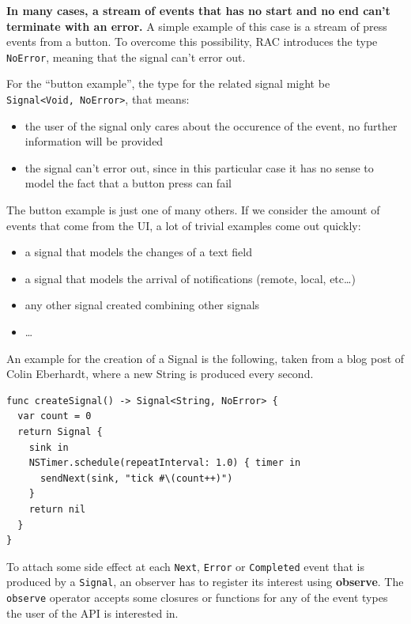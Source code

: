\textbf{In many cases, a stream of events that has no start and no end
can't terminate with an error.} A simple example of this case is a
stream of press events from a button. To overcome this possibility, RAC
introduces the type \texttt{NoError}, meaning that the signal can't
error out.

For the ``button example'', the type for the related signal might be
\texttt{Signal\textless{}Void,\ NoError\textgreater{}}, that means:

\begin{itemize}
\itemsep1pt\parskip0pt
\item
  the user of the signal only cares about the occurence of the event, no
  further information will be provided
\item
  the signal can't error out, since in this particular case it has no
  sense to model the fact that a button press can fail
\end{itemize}

The button example is just one of many others. If we consider the amount
of events that come from the UI, a lot of trivial examples come out
quickly:

\begin{itemize}
\itemsep1pt\parskip0pt
\item
  a signal that models the changes of a text field
\item
  a signal that models the arrival of notifications (remote, local,
  etc\ldots{})
\item
  any other signal created combining other signals
\item
  \ldots{}
\end{itemize}

An example for the creation of a Signal is the following, taken from a
blog post of Colin Eberhardt, where a new String is produced every
second.

\begin{verbatim}
func createSignal() -> Signal<String, NoError> {
  var count = 0
  return Signal {
    sink in
    NSTimer.schedule(repeatInterval: 1.0) { timer in
      sendNext(sink, "tick #\(count++)")
    }
    return nil
  }
}
\end{verbatim}

To attach some side effect at each \texttt{Next}, \texttt{Error} or
\texttt{Completed} event that is produced by a \texttt{Signal}, an
observer has to register its interest using \textbf{observe}. The
\texttt{observe} operator accepts some closures or functions for any of
the event types the user of the API is interested in.


